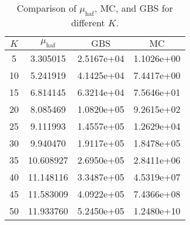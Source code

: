 \begin{table}[h!]
    \centering
    \begin{tabular}{|c|c|c|c|}
    \hline
    $K$ & $\mu_{\text{haf}}$ & $\text{GBS}$ & $\text{MC}$ \\ 
    \hline
5&3.305015 & 2.5167e+04 &1.1026e+00 \\
10&5.241919 & 4.1425e+04 &7.4417e+00 \\
15&6.814145 & 6.3214e+04 &7.5646e+01 \\
20&8.085469 & 1.0820e+05 &9.2615e+02 \\
25&9.111993 & 1.4557e+05 &1.2629e+04 \\
30&9.940470 & 1.9117e+05 &1.8478e+05 \\
35&10.608927 & 2.6950e+05 &2.8411e+06 \\
40&11.148116 & 3.3487e+05 &4.5319e+07 \\
45&11.583009 & 4.0922e+05 &7.4366e+08 \\
50&11.933760 & 5.2450e+05 &1.2480e+10 \\
\hline
    \end{tabular}
    \caption{Comparison of $\mu_{\text{haf}}$, MC, and GBS for different $K$.}
    \label{tab:comparison}
    \end{table}